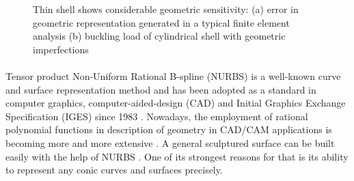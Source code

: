 \begin{figure}
    \centering
    \caption[Thin shell shows considerable geometric sensitivity]{Thin shell shows considerable geometric sensitivity: (a) error in geometric representation generated in a typical finite element analysis \citep{Gee2005} (b) buckling load of cylindrical shell with geometric imperfections \citep{Sta1985}}
    \label{intro_fig:geolimit2}
\end{figure}
%
\paragraph{}
Tensor product Non-Uniform Rational B-spline (NURBS) is a well-known curve and surface representation method and has been adopted as a standard in computer graphics, computer-aided-design (CAD) \citep{Nas2003} and Initial Graphics Exchange Specification (IGES) since 1983 \citep{IGES1983}.
Nowadays, the employment of rational polynomial functions in description of geometry in CAD/CAM applications is becoming more and more extensive \citep{Pie1987}.
A general sculptured surface can be built easily with the help of NURBS \citep{Rog2001}.
One of its strongest reasons for that is its ability to represent any conic curves and surfaces precisely.

